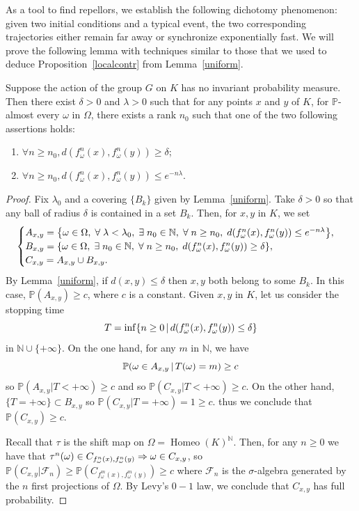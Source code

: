 \documentclass[AHL,Unicode,longabstracts,published]{cedram}
\DeclareMathOperator{\Homeo}{Homeo}
\newcommand{\bbP}{\mathbb{P}}
\newcommand{\clF}{\mathcal{F}}
\newcommand{\N}{\mathbb{N}}
\newcounter{setofcase}
\newcounter{case}[setofcase]
\renewcommand*{\implies}{\mathchoice{\Longrightarrow}{\Rightarrow}{\Rightarrow}{\Rightarrow}}
\let\originalleft\left
\let\originalright\right
\renewcommand{\left}{\mathopen{}\mathclose\bgroup\originalleft}
\renewcommand{\right}{\aftergroup\egroup\originalright}
\let\oldexists\exists
\renewcommand*{\exists}{\mathrel{\oldexists}}
\let\oldforall\forall
\renewcommand*{\forall}{\mathrel{\oldforall}}
\begin{document}
As a tool to find repellors, we establish the following dichotomy phenomenon: given two initial conditions and a typical event, the two corresponding trajectories either remain far away or synchronize exponentially fast. We will prove the following lemma with techniques similar to those that we used to deduce Proposition~\ref{localcontr} from Lemma~\ref{uniform}.

\begin{lemm}\label{synchro}
Suppose the action of the group $G$ on $K$ has no invariant probability measure. Then there exist $\delta >0$ and $\lambda>0$ such that for any points $x$ and $y$ of $K$, for $\bbP$-almost every $\omega$ in $\Omega$, there exists a rank $n_0$ such that one of the two following assertions holds:
\begin{enumerate}
\item\label{lemm5.4.1} $\forall n\geq n_0, d(f^{n}_{\omega}(x),f^{n}_{\omega}(y)) \geq \delta$;
\item\label{lemm5.4.2} $\forall n\geq n_0, d(f^{n}_{\omega}(x),f^{n}_{\omega}(y))\leq e^{-n\lambda}$.
\end{enumerate}
\end{lemm}
\begin{proof}
Fix $\lambda_0$ and a covering $\{B_k\}$ given by Lemma~\ref{uniform}. Take $\delta>0$ so that any ball of radius $\delta$ is contained in a set $B_k$. Then, for $x,y$ in $K$, we set
\[
\begin{cases}
A_{x,y}=\left\{\omega\in\Omega,\;\forall \lambda<\lambda_0, \;\exists n_0\in \N,\; \forall n\geq n_0,\; d\left(f_\omega^n(x),f_\omega^n(y)\right)\leq e^{-n\lambda}\right\},\\
B_{x,y}=\left\{\omega\in \Omega,\; \exists n_0\in \N,\; \forall n\geq n_0,\; d(f_\omega^n(x),f_\omega^n(y))\geq \delta\right\},\\
C_{x,y}=A_{x,y}\cup B_{x,y}.
\end{cases}
\]
By Lemma~\ref{uniform}, if $d(x,y)\leq \delta$ then $x,y$ both belong to some $B_k$. In this case, $\bbP(A_{x,y})\geq c$, where $c$ is a constant. Given $x,y$ in $K$, let us consider the stopping time
\[
T=\inf\left\{n\geq 0\,\middle|\, d\left(f_\omega^n(x),f_\omega^n(y)\right)\leq \delta \right\}
\]
in $\N\cup\{+\infty\}$. On the one hand, for any $m$ in $\N$, we have
\[
\bbP\left(\omega\in A_{x,y}\,\middle|\,T(\omega)=m\right)\geq c
\]
so $\bbP(A_{x,y}|T<+\infty)\geq c$ and so $\bbP(C_{x,y}|T<+\infty)\geq c$. On the other hand, $\{T=+\infty\}\subset B_{x,y}$ so $\bbP(C_{x,y}|T=+\infty)=1\geq c$. thus we conclude that $\bbP(C_{x,y})\geq c$.

Recall that $\tau$ is the shift map on $\Omega=\Homeo(K)^\N$. Then, for any $n\geq 0$ we have that $\tau^n(\omega)\in C_{f_\omega^n(x),f_\omega^n(y)}\implies \omega\in C_{x,y}$, so $\bbP(C_{x,y}|\clF_n)\geq \bbP(C_{f_\omega^m(x),f_\omega^m(y)})\geq c$ where $\clF_n$ is the $\sigma$-algebra generated by the $n$ first projections of $\Omega$. By Levy's $0-1$ law, we conclude that $C_{x,y}$ has full probability.
\end{proof}
\end{document}
